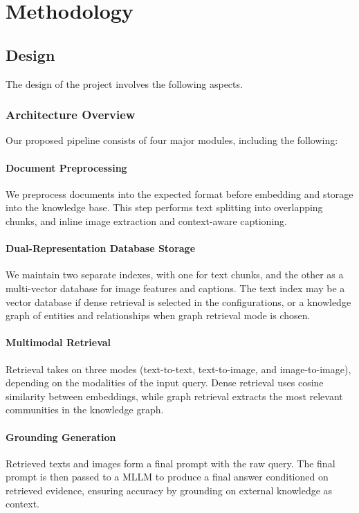 \section{Methodology}


\subsection{Design}

The design of the project involves the following aspects. 

\subsubsection{Architecture Overview}

Our proposed pipeline consists of four major modules, including the following:

\paragraph{Document Preprocessing}
We preprocess documents into the expected format before embedding and storage into the knowledge base.
This step performs text splitting into overlapping chunks, and inline image extraction and context-aware captioning.

\paragraph{Dual-Representation Database Storage}
We maintain two separate indexes, with one for text chunks, and the other as a multi-vector database for image features and captions.
The text index may be a vector database if dense retrieval is selected in the configurations,
or a knowledge graph of entities and relationships when graph retrieval mode is chosen.

\paragraph{Multimodal Retrieval}
Retrieval takes on three modes (text-to-text, text-to-image, and image-to-image), depending on the modalities of the input query.
Dense retrieval uses cosine similarity between embeddings, while graph retrieval extracts the most relevant communities in the knowledge graph.

\paragraph{Grounding Generation}
Retrieved texts and images form a final prompt with the raw query.
The final prompt is then passed to a MLLM to produce a final answer conditioned on retrieved evidence,
ensuring accuracy by grounding on external knowledge as context.


